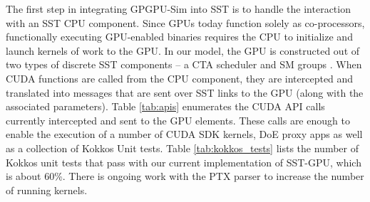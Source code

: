 The first step in integrating GPGPU-Sim into SST is to handle the interaction
with an SST CPU component. Since GPUs today function solely as co-processors,
functionally executing GPU-enabled binaries requires the CPU to initialize and
launch kernels of work to the GPU. In our model, the GPU is constructed out of
two types of discrete SST components -- a CTA scheduler and SM groups \cite{v100}.
When CUDA functions are called from the CPU component, they are intercepted and translated
into messages that are sent over SST links to the GPU (along with the associated
parameters). Table \ref{tab:apis} enumerates the CUDA API calls currently intercepted
and sent to the GPU elements. These calls are enough to enable the execution of
a number of CUDA SDK kernels, DoE proxy apps as well as a collection of Kokkos Unit
tests. Table \ref{tab:kokkos_tests} lists the number of Kokkos unit tests that
pass with our current implementation of SST-GPU, which is about 60\%. There is
ongoing work with the PTX parser to increase the number of running kernels.


